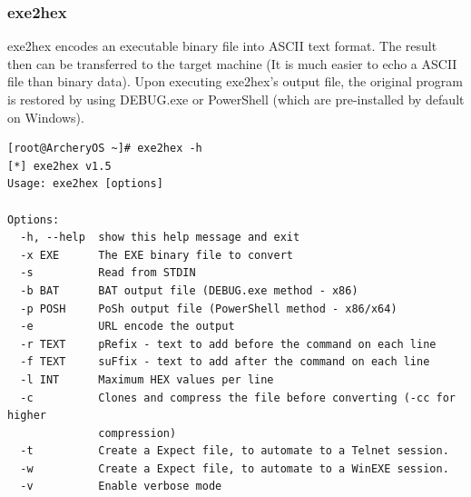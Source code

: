 \documentclass{article}
\begin{document}
\subsubsection{exe2hex}
exe2hex encodes an executable binary file into ASCII text format.
The result then can be transferred to the target machine (It is much easier to echo a ASCII file than binary data).
Upon executing exe2hex's output file, the original program is restored by using DEBUG.exe or PowerShell (which are pre-installed by default on Windows).
\begin{lstlisting}
[root@ArcheryOS ~]# exe2hex -h
[*] exe2hex v1.5
Usage: exe2hex [options]

Options:
  -h, --help  show this help message and exit
  -x EXE      The EXE binary file to convert
  -s          Read from STDIN
  -b BAT      BAT output file (DEBUG.exe method - x86)
  -p POSH     PoSh output file (PowerShell method - x86/x64)
  -e          URL encode the output
  -r TEXT     pRefix - text to add before the command on each line
  -f TEXT     suFfix - text to add after the command on each line
  -l INT      Maximum HEX values per line
  -c          Clones and compress the file before converting (-cc for higher
              compression)
  -t          Create a Expect file, to automate to a Telnet session.
  -w          Create a Expect file, to automate to a WinEXE session.
  -v          Enable verbose mode
\end{lstlisting}
\end{document}

